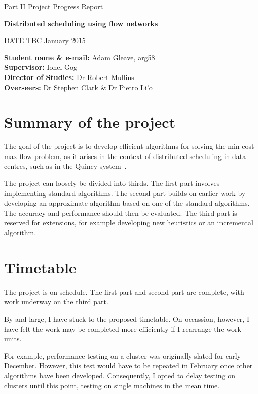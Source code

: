 
\centerline{\Large Part II Project Progress Report}
\vspace{0.1in}
\centerline{\large \textbf{Distributed scheduling using flow networks}}
\vspace{0.1in}
\centerline{DATE TBC January 2015}


\textbf{Student name \& e-mail:} Adam Gleave, arg58 \hfil \\
\textbf{Supervisor:} Ionel Gog \hfil \\
\textbf{Director of Studies:} Dr Robert Mullins \hfil \\
\textbf{Overseers:} Dr Stephen Clark \& Dr Pietro Li\a'o \hfil \\


\section{Summary of the project}
The goal of the project is to develop efficient algorithms for solving the min-cost max-flow problem, as it arises in the context of distributed scheduling in data centres, such as in the Quincy system~\cite{Isard:2009}. 

The project can loosely be divided into thirds. The first part involves implementing standard algorithms. The second part builds on earlier work by developing an approximate algorithm based on one of the standard algorithms. The accuracy and performance should then be evaluated. The third part is reserved for extensions, for example developing new heuristics or an incremental algorithm.

\section{Timetable}
The project is on schedule. The first part and second part are complete, with work underway on the third part. 

By and large, I have stuck to the proposed timetable. On occassion, however, I have felt the work may be completed more efficiently if I rearrange the work units. 

For example, performance testing on a cluster was originally slated for early December. However, this test would have to be repeated in February once other algorithms have been developed. Consequently, I opted to delay testing on clusters until this point, testing on single machines in the mean time.

